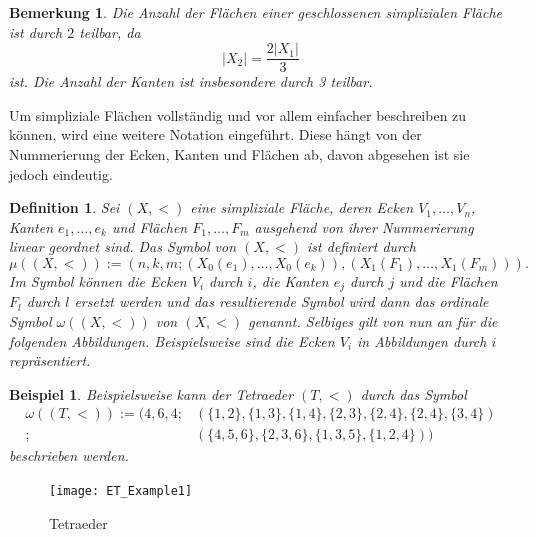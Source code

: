 \documentclass[12pt,titlepage,twoside,cleardoublepage]{article}
\theoremstyle{nummermitklammern}
\newtheorem{bsp}[temp]{Beispiel}
\newtheorem{definition}[temp]{Definition}
\newtheorem{bemerkung}[temp]{Bemerkung}
\newtheorem{definition}[zahl]{Definition}
\newtheorem{bsp}[zahl]{Beispiel}
\newtheorem{bemerkung}[zahl]{Bemerkung}
\numberwithin{equation}{section}
\begin{document}
\begin{bemerkung}
Die Anzahl der Flächen einer geschlossenen simplizialen Fläche ist durch $2$ teilbar, da
\[
\vert X_{2} \vert = \frac{2\vert X_{1}\vert}{3}
\]
ist.
Die Anzahl der Kanten ist insbesondere durch 3 teilbar. 
\end{bemerkung}
Um simpliziale Flächen vollständig und vor allem einfacher beschreiben zu können, wird eine weitere Notation eingeführt. Diese hängt von der Nummerierung der Ecken, Kanten und Flächen ab, davon abgesehen ist sie jedoch eindeutig.
\begin{definition}
 Sei $(X,<)$ eine simpliziale Fläche, deren Ecken $V_{1},\ldots,V_{n}$, Kanten $e_{1},\ldots,e_{k}$ und Flächen $F_{1},\ldots,F_{m}$ ausgehend von ihrer Nummerierung linear geordnet sind. Das \emph{Symbol} von $(X,<)$ ist definiert durch 
\[
\mu((X,<)):=(n,k,m;(X_{0}(e_{1}),\ldots,X_{0}(e_{k})),(X_{1}(F_{1}),\ldots,X_{1}(F_{m}))).
\]
Im Symbol können die Ecken $V_{i}$ durch $i$, die Kanten $e_{j}$ durch $j$ und die Flächen $F_{l}$ durch $l$ ersetzt werden und das resultierende Symbol wird dann das \emph{ordinale Symbol} $\omega((X,<))$ von $(X,<)$ genannt. Selbiges gilt von nun an für die folgenden Abbildungen. Beispielsweise sind die Ecken $V_i$ in Abbildungen durch $i$ repräsentiert. 
\end{definition}
\begin{bsp}
Beispielsweise kann der Tetraeder $(T,<)$ durch das Symbol 
\begin{align*}
\omega ((T,<)):=(4,6,4;&(\{1,2\}, \{1,3\},\{1,4\},\{2,3\},\{2,4\},\{2,4\},\{3,4\})\\
;&(\{4,5,6\},\{2,3,6\},\{1,3,5\},\{1,2,4\}))
\end{align*}
beschrieben werden.
\end{bsp}
\begin{figure}[H]
\begin{center}
\texttt{[image: ET\_Example1]}
\end{center}
\caption{Tetraeder}
\end{figure}
\end{document}
